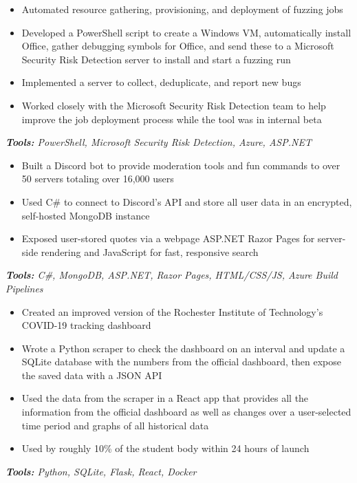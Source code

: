 \documentclass[10pt,letter]{altacv}
\begin{document}
\begin{itemize}
\item Automated resource gathering, provisioning, and deployment of fuzzing jobs
\item Developed a PowerShell script to create a Windows VM, automatically install Office, gather debugging symbols for Office, and send these to a Microsoft \\ Security Risk Detection server to install and start a fuzzing run
\item Implemented a server to collect, deduplicate, and report new bugs
\item Worked closely with the Microsoft Security Risk Detection team to help improve the job deployment process while the tool was in internal beta
\end{itemize}
\textit{\textbf{Tools:} PowerShell, Microsoft Security Risk Detection, Azure, ASP.NET}

\medskip 


\begin{itemize}
\item Built a Discord bot to provide moderation tools and fun commands to over 50 servers totaling over 16,000 users
\item Used C\# to connect to Discord's API and store all user data in an encrypted, self-hosted MongoDB instance
\item Exposed user-stored quotes via a webpage ASP.NET Razor Pages for server-side rendering and JavaScript for fast, responsive search
\end{itemize}
\textit{\textbf{Tools:} C\#, MongoDB, ASP.NET, Razor Pages, HTML/CSS/JS, Azure Build Pipelines}

\smallskip
\divider
\smallskip

\begin{itemize}
\item Created an improved version of the Rochester Institute of Technology's COVID-19 tracking dashboard
\item Wrote a Python scraper to check the dashboard on an interval and update a SQLite database with the numbers from the official dashboard, then expose the saved data with a JSON API
\item Used the data from the scraper in a React app that provides all the information from the official dashboard as well as changes over a user-selected time period and graphs of all historical data
\item Used by roughly 10\% of the student body within 24 hours of launch
\end{itemize}
\textit{\textbf{Tools:} Python, SQLite, Flask, React, Docker}
\end{document}
